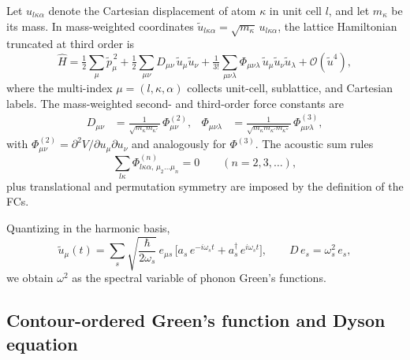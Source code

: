 Let $u_{l\kappa\alpha}$ denote the Cartesian displacement of atom $\kappa$
in unit cell $l$, and let $m_\kappa$ be its mass. In
mass-weighted coordinates $\tilde{u}_{l\kappa\alpha}=\sqrt{m_\kappa}\,u_{l\kappa\alpha}$,
the lattice Hamiltonian truncated at third order is
\begin{equation}\label{eq:H_phonon}
  \hat{H}
  = \tfrac{1}{2}\sum_{\mu}\tilde{p}_\mu^{\,2}
    + \tfrac{1}{2}\sum_{\mu\nu} D_{\mu\nu}\,\tilde{u}_\mu \tilde{u}_\nu
    + \tfrac{1}{3!}\sum_{\mu\nu\lambda} \Phi_{\mu\nu\lambda}\,
      \tilde{u}_\mu \tilde{u}_\nu \tilde{u}_\lambda
    + \mathcal{O}(\tilde{u}^4),
\end{equation}
where the multi-index $\mu = (l,\kappa,\alpha)$ collects unit-cell,
sublattice, and Cartesian labels. The mass-weighted second- and
third-order force constants are
\begin{align}
  D_{\mu\nu} &= \frac{1}{\sqrt{m_\kappa m_{\kappa'}}}\,\Phi^{(2)}_{\mu\nu}, &
  \Phi_{\mu\nu\lambda} &= \frac{1}{\sqrt{m_\kappa m_{\kappa'} m_{\kappa''}}}\,\Phi^{(3)}_{\mu\nu\lambda},
\end{align}
with $\Phi^{(2)}_{\mu\nu}=\partial^2 V/\partial u_\mu \partial u_\nu$ and analogously
for $\Phi^{(3)}$. The acoustic sum rules
\begin{equation}\label{eq:asr}
  \sum_{l\kappa} \Phi^{(n)}_{l\kappa\alpha,\,\mu_2\ldots\mu_n}
  = 0
  \qquad (n = 2, 3, \ldots),
\end{equation}
plus translational and permutation symmetry are imposed by the definition of the FCs.

Quantizing in the harmonic basis,
\begin{equation}
  \tilde{u}_\mu(t)
  = \sum_{s} \sqrt{\frac{\hbar}{2\omega_s}}\,e_{\mu s}\,
    \bigl[a_s\,e^{-i\omega_s t} + a_s^\dagger\,e^{i\omega_s t}\bigr],
  \qquad D\,e_s = \omega_s^2\,e_s,
\end{equation}
we obtain $\omega^2$ as the spectral variable of phonon Green's
functions.

\subsection{Contour-ordered Green's function and Dyson equation}
\label{sub:ph_dyson}

